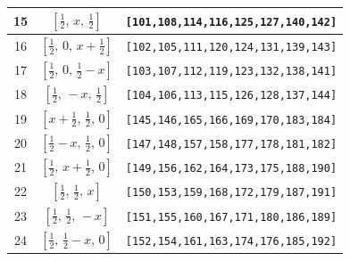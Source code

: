 \documentclass[fleqn,8pt]{jsarticle}
\begin{document}
\begin{longtable}{ccc}
15 & $\left[ \frac{1}{2},\, x,\, \frac{1}{2} \right]$ & {\tt [101,108,114,116,125,127,140,142]} \\ \hline
16 & $\left[ \frac{1}{2},\, 0,\, x + \frac{1}{2} \right]$ & {\tt [102,105,111,120,124,131,139,143]} \\ \hline
17 & $\left[ \frac{1}{2},\, 0,\, \frac{1}{2} - x \right]$ & {\tt [103,107,112,119,123,132,138,141]} \\ \hline
18 & $\left[ \frac{1}{2},\, - x,\, \frac{1}{2} \right]$ & {\tt [104,106,113,115,126,128,137,144]} \\ \hline
19 & $\left[ x + \frac{1}{2},\, \frac{1}{2},\, 0 \right]$ & {\tt [145,146,165,166,169,170,183,184]} \\ \hline
20 & $\left[ \frac{1}{2} - x,\, \frac{1}{2},\, 0 \right]$ & {\tt [147,148,157,158,177,178,181,182]} \\ \hline
21 & $\left[ \frac{1}{2},\, x + \frac{1}{2},\, 0 \right]$ & {\tt [149,156,162,164,173,175,188,190]} \\ \hline
22 & $\left[ \frac{1}{2},\, \frac{1}{2},\, x \right]$ & {\tt [150,153,159,168,172,179,187,191]} \\ \hline
23 & $\left[ \frac{1}{2},\, \frac{1}{2},\, - x \right]$ & {\tt [151,155,160,167,171,180,186,189]} \\ \hline
24 & $\left[ \frac{1}{2},\, \frac{1}{2} - x,\, 0 \right]$ & {\tt [152,154,161,163,174,176,185,192]} \\
\end{longtable}
\renewcommand{\arraystretch}{1.2}
\end{document}
